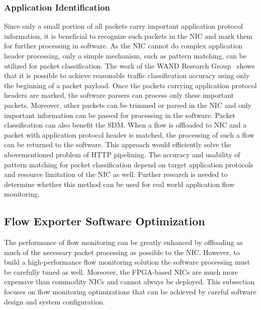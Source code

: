 \subsubsection{Application Identification}
Since only a small portion of all packets carry important application protocol information, it is beneficial to recognize such packets in the NIC and mark them for further processing in software. As the NIC cannot do complex application header processing, only a simple mechanism, such as pattern matching, can be utilized for packet classification. The work of the WAND Research Group~\cite{Alcock-2012-libprotoident} shows that it is possible to achieve reasonable traffic classification accuracy using only the beginning of a packet payload. Once the packets carrying application protocol headers are marked, the software parsers can process only these important packets. Moreover, other packets can be trimmed or parsed in the NIC and only important information can be passed for processing in the software. Packet classification can also benefit the SDM. When a flow is offloaded to NIC and a packet with application protocol header is matched, the processing of such a flow can be returned to the software. This approach would efficiently solve the abovementioned problem of HTTP pipelining. The accuracy and usability of pattern matching for packet classification depend on target application protocols and resource limitation of the NIC as well. Further research is needed to determine whether this method can be used for real world application flow monitoring.


\subsection{Flow Exporter Software Optimization}\label{sec:performance-sw-optimization}

The performance of flow monitoring can be greatly enhanced by offloading as much of the necessary packet processing as possible to the NIC. However, to build a high-performance flow monitoring solution the software processing must be carefully tuned as well. Moreover, the FPGA-based NICs are much more expensive than commodity NICs and cannot always be deployed. This subsection focuses on flow monitoring optimizations that can be achieved by careful software design and system configuration.

